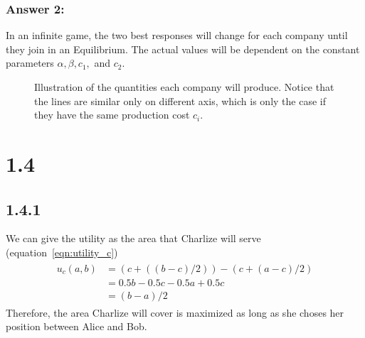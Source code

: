 \documentclass[11pt]{article}
\begin{document}
    \subsubsection{Answer 2:}
    In an infinite game, the two best responses will change for each company until they join in an Equilibrium. The actual values
    will be dependent on the constant parameters $\alpha, \beta, c_1,$ and $c_2$.
    \begin{figure}[h]
        \caption{Illustration of the quantities each company will produce. Notice that the lines are similar only on different axis,
            which is only the case if they have the same production cost $c_i$.}
    \end{figure}
    \section*{1.4}
    \subsection*{1.4.1}
    We can give the utility as the area that Charlize will serve (equation~\ref{eqn:utility_c})
    \begin{align}
        \begin{split}
            u_c(a, b)&=(c+((b-c)/2)) - (c+(a-c)/2)\\
            & = 0.5b - 0.5c - 0.5a + 0.5c\\
            & = (b-a)/2
        \end{split}
        \label{eqn:utility_c}
    \end{align}
    Therefore, the area Charlize will cover is maximized as long as she choses her position between Alice and Bob.
\end{document}
